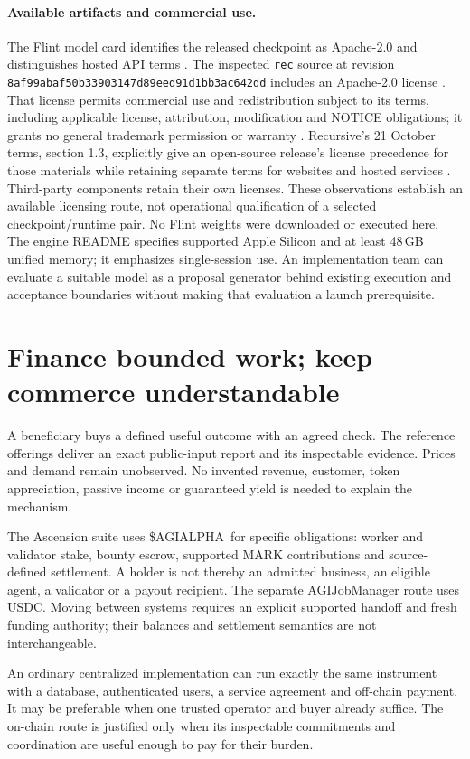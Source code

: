 \documentclass[11pt,letterpaper]{article}
\newcommand{\AGI}{\$AGIALPHA}
\begin{document}
\paragraph{Available artifacts and commercial use.}
The Flint model card identifies the released checkpoint as Apache-2.0 and distinguishes hosted API terms \cite{flintcard}. The inspected \texttt{rec} source at revision \nolinkurl{8af99abaf50b33903147d89eed91d1bb3ac642dd} includes an Apache-2.0 license \cite{rec}. That license permits commercial use and redistribution subject to its terms, including applicable license, attribution, modification and NOTICE obligations; it grants no general trademark permission or warranty \cite{apache2}. Recursive's 21 October terms, section 1.3, explicitly give an open-source release's license precedence for those materials while retaining separate terms for websites and hosted services \cite{recursiveterms}. Third-party components retain their own licenses. These observations establish an available licensing route, not operational qualification of a selected checkpoint/runtime pair. No Flint weights were downloaded or executed here. The engine README specifies supported Apple Silicon and at least 48\,GB unified memory; it emphasizes single-session use. An implementation team can evaluate a suitable model as a proposal generator behind existing execution and acceptance boundaries without making that evaluation a launch prerequisite.


\section{Finance bounded work; keep commerce understandable}
A beneficiary buys a defined useful outcome with an agreed check. The reference offerings deliver an exact public-input report and its inspectable evidence. Prices and demand remain unobserved. No invented revenue, customer, token appreciation, passive income or guaranteed yield is needed to explain the mechanism.

The Ascension suite uses \AGI\ for specific obligations: worker and validator stake, bounty escrow, supported MARK contributions and source-defined settlement. A holder is not thereby an admitted business, an eligible agent, a validator or a payout recipient. The separate AGIJobManager route uses USDC. Moving between systems requires an explicit supported handoff and fresh funding authority; their balances and settlement semantics are not interchangeable.

An ordinary centralized implementation can run exactly the same instrument with a database, authenticated users, a service agreement and off-chain payment. It may be preferable when one trusted operator and buyer already suffice. The on-chain route is justified only when its inspectable commitments and coordination are useful enough to pay for their burden.
\end{document}
